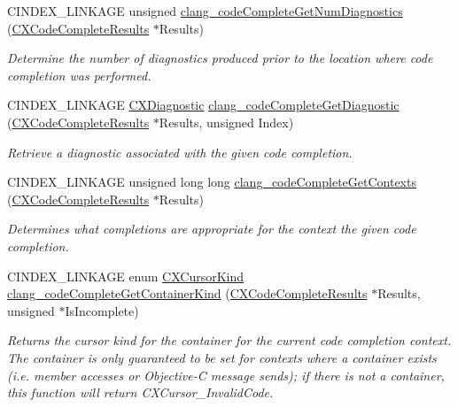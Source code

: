 \begin{DoxyCompactItemize}
\mbox{\label{group__CINDEX__CODE__COMPLET_ga0cce4aff990ed511c1878a23c57e87fa}} 
C\+I\+N\+D\+E\+X\+\_\+\+L\+I\+N\+K\+A\+GE unsigned \mbox{\hyperlink{group__CINDEX__CODE__COMPLET_ga0cce4aff990ed511c1878a23c57e87fa}{clang\+\_\+code\+Complete\+Get\+Num\+Diagnostics}} (\mbox{\hyperlink{structCXCodeCompleteResults}{C\+X\+Code\+Complete\+Results}} $\ast$Results)
\begin{DoxyCompactList}\small\item\em Determine the number of diagnostics produced prior to the location where code completion was performed. \end{DoxyCompactList}\item 
C\+I\+N\+D\+E\+X\+\_\+\+L\+I\+N\+K\+A\+GE \mbox{\hyperlink{group__CINDEX__DIAG_ga44bb8aba7c40590ad25d1763c4fbff7f}{C\+X\+Diagnostic}} \mbox{\hyperlink{group__CINDEX__CODE__COMPLET_gab298febc86d15c50265ff440e6da1913}{clang\+\_\+code\+Complete\+Get\+Diagnostic}} (\mbox{\hyperlink{structCXCodeCompleteResults}{C\+X\+Code\+Complete\+Results}} $\ast$Results, unsigned Index)
\begin{DoxyCompactList}\small\item\em Retrieve a diagnostic associated with the given code completion. \end{DoxyCompactList}\item 
C\+I\+N\+D\+E\+X\+\_\+\+L\+I\+N\+K\+A\+GE unsigned long long \mbox{\hyperlink{group__CINDEX__CODE__COMPLET_ga76f5354e478002585b6bd3aba1d20582}{clang\+\_\+code\+Complete\+Get\+Contexts}} (\mbox{\hyperlink{structCXCodeCompleteResults}{C\+X\+Code\+Complete\+Results}} $\ast$Results)
\begin{DoxyCompactList}\small\item\em Determines what completions are appropriate for the context the given code completion. \end{DoxyCompactList}\item 
C\+I\+N\+D\+E\+X\+\_\+\+L\+I\+N\+K\+A\+GE enum \mbox{\hyperlink{group__CINDEX_gaaccc432245b4cd9f2d470913f9ef0013}{C\+X\+Cursor\+Kind}} \mbox{\hyperlink{group__CINDEX__CODE__COMPLET_ga7a7f0964e4b73192715489125dc9bf7e}{clang\+\_\+code\+Complete\+Get\+Container\+Kind}} (\mbox{\hyperlink{structCXCodeCompleteResults}{C\+X\+Code\+Complete\+Results}} $\ast$Results, unsigned $\ast$Is\+Incomplete)
\begin{DoxyCompactList}\small\item\em Returns the cursor kind for the container for the current code completion context. The container is only guaranteed to be set for contexts where a container exists (i.\+e. member accesses or Objective-\/C message sends); if there is not a container, this function will return C\+X\+Cursor\+\_\+\+Invalid\+Code. \end{DoxyCompactList}\item 

\end{DoxyCompactItemize}

